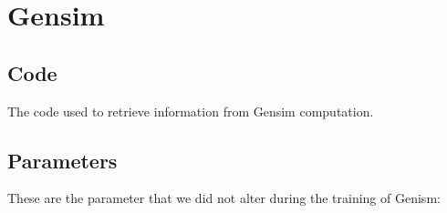 


\chapter{Gensim}
\section{Code}
The code used to retrieve information from Gensim computation. 


\section{Parameters}
These are the parameter that we did not alter during the training of Genism:
